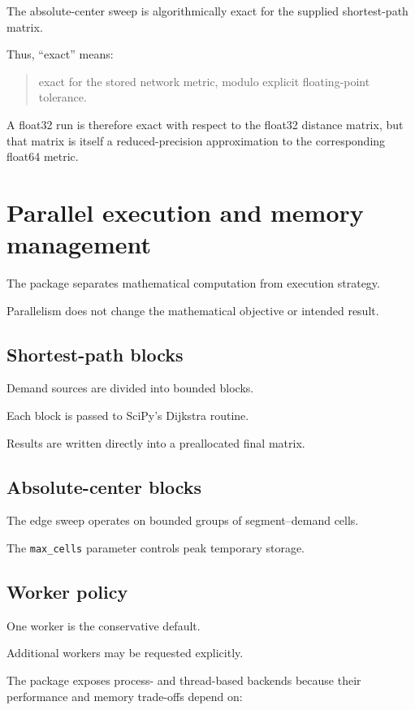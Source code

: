 \documentclass[11pt]{article}
\begin{document}
The absolute-center sweep is algorithmically exact for the supplied
shortest-path matrix.

Thus, ``exact'' means:

\begin{quote}
exact for the stored network metric, modulo explicit floating-point tolerance.
\end{quote}

A float32 run is therefore exact with respect to the float32 distance matrix,
but that matrix is itself a reduced-precision approximation to the
corresponding float64 metric.

\section{Parallel execution and memory management}

The package separates mathematical computation from execution strategy.

Parallelism does not change the mathematical objective or intended result.

\subsection{Shortest-path blocks}

Demand sources are divided into bounded blocks.

Each block is passed to SciPy's Dijkstra routine.

Results are written directly into a preallocated final matrix.

\subsection{Absolute-center blocks}

The edge sweep operates on bounded groups of segment--demand cells.

The \texttt{max\_cells} parameter controls peak temporary storage.

\subsection{Worker policy}

One worker is the conservative default.

Additional workers may be requested explicitly.

The package exposes process- and thread-based backends because their
performance and memory trade-offs depend on:
\end{document}
